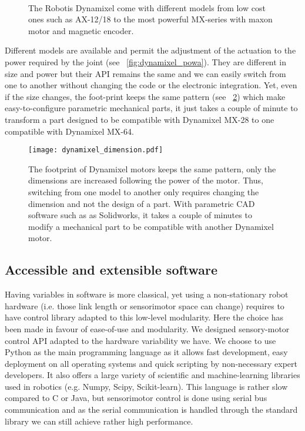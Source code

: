 \begin{figure}[tb]
\centering
    \hfil
    \\
    \caption{The Robotis Dynamixel come with different models from low cost ones such as AX-12/18 to the most powerful MX-series with maxon motor and magnetic encoder.}
    \label{fig:dynamixel_serie}
\end{figure}

Different models are available and permit the adjustment of the actuation to the power required by the joint (see \figurename~\ref{fig:dynamixel_powa}). They are different in size and power but their API remains the same and we can easily switch from one to another without changing the code or the electronic integration. Yet, even if the size changes, the foot-print keeps the same pattern (see \figurename~\ref{fig:dynamixel_dimension}) which make easy-to-configure parametric mechanical parts, it just takes a couple of minute to transform a part designed to be compatible with Dynamixel MX-28 to one compatible with Dynamixel MX-64.


\begin{figure}[tb]
    \begin{center}
        \texttt{[image: dynamixel\_dimension.pdf]}
    \end{center}
    \caption{The footprint of Dynamixel motors keeps the same pattern, only the dimensions are increased following the power of the motor. Thus, switching from one model to another only requires changing the dimension and not the design of a part. With parametric CAD software such as as Solidworks, it takes a couple of minutes to modify a mechanical part to be compatible with another Dynamixel motor.}
    \label{fig:dynamixel_dimension}
\end{figure}


\subsection{Accessible and extensible software} %

Having variables in software is more classical, yet using a non-stationary robot hardware (i.e. those link length or sensorimotor space can change) requires to have control library adapted to this low-level modularity. Here the choice has been made in favour of ease-of-use and modularity. We designed sensory-motor control API adapted to the hardware variability we have. We choose to use Python as the main programming language as it allows fast development, easy deployment on all operating systems and quick scripting by non-necessary expert developers. It also offers a large variety of scientific and machine-learning libraries used in robotics (e.g. Numpy, Scipy, Scikit-learn).
This language is rather slow compared to C or Java, but sensorimotor control is done using serial bus communication and as the serial communication is handled through the standard library we can still achieve rather high performance.

